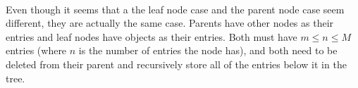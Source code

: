 \documentclass{article}
\begin{document}
\paragraph{}
Even though it seems that a the leaf node case and the parent node case seem different, they are actually the same case. Parents have
other nodes as their entries and leaf nodes have objects as their entries. Both must have $m \le n \le M$ entries (where $n$ is the number
of entries the node has), and both need to be deleted from their parent and recursively store all of the entries below it in the tree.



\end{document}

